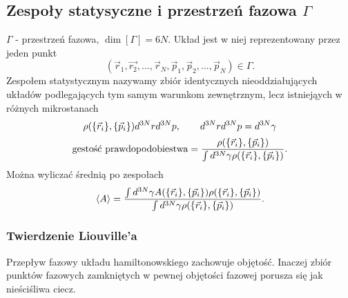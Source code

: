 \subsection{Zespoły statysyczne i przestrzeń fazowa $\Gamma$}
$\Gamma$ - przestrzeń fazowa, $\dim [\Gamma]=6N$. Układ jest w niej reprezentowany przez jeden punkt 
$$(\vec{r}_1,\vec{r_2},\ldots,\vec{r}_N,\vec{p}_1,\vec{p}_2,\ldots,\vec{p}_N) \in \Gamma . $$
Zespołem statystycznym nazywamy zbiór identycznych nieoddziałujących układów podlegających tym samym warunkom
zewnętrznym, lecz istniejąych w różnych mikrostanach
$$\rho(\{\vec{r}_i\},\{ \vec{p}_i \}) d^{3N}rd^{3N}p, \qquad  d^{3N} r d^{3N} p = d^{3N}\gamma$$
$$ \mbox{gestość prawdopodobiestwa} = \dfrac{\rho(\{\vec{r}_i\},\{ \vec{p}_i \})}{\int d^{3N}\gamma \rho (\{\vec{r}_i\},\{ \vec{p}_i \})}.$$
Można wyliczać średnią po zespołach
$$\left< A \right> = \dfrac{\int d^{3N}\gamma A(\{\vec{r}_i\},\{ \vec{p}_i \}) \rho(\{\vec{r}_i\},\{ \vec{p}_i \})}{\int d^{3N}\gamma \rho(\{\vec{r}_i\},\{ \vec{p}_i \})}.$$
\subsubsection{Twierdzenie Liouville'a}
Przepływ fazowy układu hamiltonowskiego zachowuje objętość. Inaczej zbiór punktów fazowych 
zamkniętych w pewnej objętości fazowej porusza się jak nieściśliwa ciecz.
